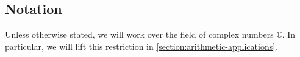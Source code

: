 \documentclass[12 pt]{amsart}
\theoremstyle{plain}
\theoremstyle{definition}
\theoremstyle{remark}
\numberwithin{equation}{section}
\begin{document}

\subsection{Notation}
\label{subsection:notation}
Unless otherwise stated, we will work over the field of complex numbers $\mathbb{C}$. 
In particular, we will lift this restriction in
\autoref{section:arithmetic-applications}.
\end{document}
